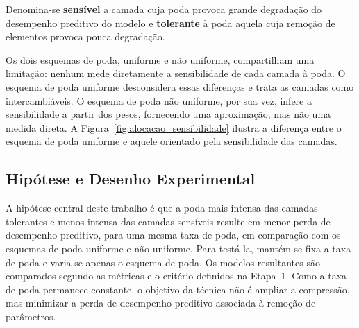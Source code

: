Denomina-se \textbf{sensível} a camada cuja poda provoca grande degradação do desempenho
preditivo do modelo e \textbf{tolerante} à poda aquela cuja remoção de elementos provoca
pouca degradação.

Os dois esquemas de poda, uniforme e não uniforme, compartilham
uma limitação: nenhum mede diretamente a sensibilidade de cada camada à poda. O esquema de
poda uniforme desconsidera essas diferenças e trata as camadas como intercambiáveis. O
esquema de poda não uniforme, por sua vez, infere a sensibilidade a partir dos pesos,
fornecendo uma aproximação, mas não uma medida direta. A
Figura~\ref{fig:alocacao_sensibilidade} ilustra a diferença entre o esquema de poda uniforme
e aquele orientado pela sensibilidade das camadas.

\subsection{Hipótese e Desenho Experimental}

A hipótese central deste trabalho é que a poda mais intensa das camadas tolerantes e menos
intensa das camadas sensíveis resulte em menor perda de desempenho preditivo, para uma mesma
taxa de poda, em comparação com os esquemas de poda uniforme e não uniforme. Para testá-la,
mantém-se fixa a taxa de poda e varia-se apenas o esquema de poda. Os modelos resultantes
são comparados segundo as métricas e o critério definidos na
Etapa~1. Como a taxa de poda permanece constante, o objetivo da
técnica não é ampliar a compressão, mas minimizar a perda de desempenho preditivo associada à
remoção de parâmetros.


